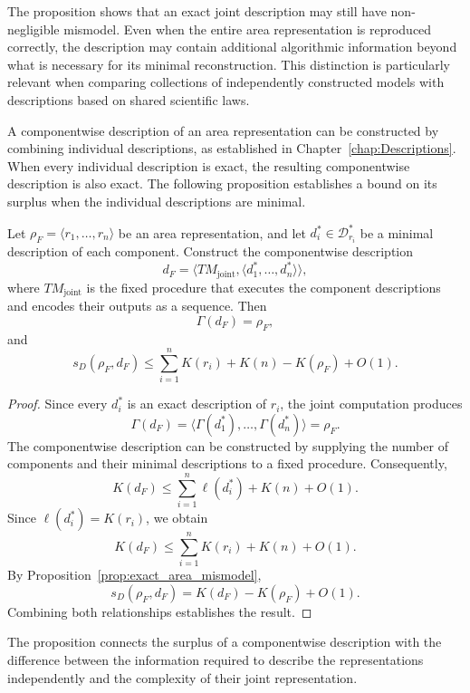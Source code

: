 The proposition shows that an exact joint description may still have non-negligible mismodel. Even when the entire area representation is reproduced correctly, the description may contain additional algorithmic information beyond what is necessary for its minimal reconstruction. This distinction is particularly relevant when comparing collections of independently constructed models with descriptions based on shared scientific laws.

A componentwise description of an area representation can be constructed by combining individual descriptions, as established in Chapter~\ref{chap:Descriptions}. When every individual description is exact, the resulting componentwise description is also exact. The following proposition establishes a bound on its surplus when the individual descriptions are minimal.

\begin{proposition}
\label{prop:componentwise_area_surplus}
Let $\rho_F=\langle r_1,\ldots,r_n\rangle$ be an area representation, and let $d_i^\ast\in\mathcal D_{r_i}^\ast$ be a minimal description of each component. Construct the componentwise description
\[
d_F = \langle TM_{\mathrm{joint}}, \langle d_1^\ast,\ldots,d_n^\ast\rangle\rangle,
\]
where $TM_{\mathrm{joint}}$ is the fixed procedure that executes the component descriptions and encodes their outputs as a sequence. Then
\[
\Gamma(d_F)=\rho_F,
\]
and
\[
s_D(\rho_F,d_F) \leq \sum_{i=1}^{n}K(r_i) + K(n) - K(\rho_F) + O(1).
\]
\end{proposition}
\begin{proof}
Since every $d_i^\ast$ is an exact description of $r_i$, the joint computation produces
\[
\Gamma(d_F) = \langle\Gamma(d_1^\ast),\ldots, \Gamma(d_n^\ast)\rangle = \rho_F.
\]
The componentwise description can be constructed by supplying the number of components and their minimal descriptions to a fixed procedure. Consequently,
\[
K(d_F) \leq \sum_{i=1}^{n}\ell(d_i^\ast) + K(n) + O(1).
\]
Since $\ell(d_i^\ast)=K(r_i)$, we obtain
\[
K(d_F) \leq \sum_{i=1}^{n}K(r_i)+K(n)+O(1).
\]
By Proposition~\ref{prop:exact_area_mismodel},
\[
s_D(\rho_F,d_F) = K(d_F)-K(\rho_F)+O(1).
\] 
Combining both relationships establishes the result.
\end{proof}

The proposition connects the surplus of a componentwise description with the difference between the information required to describe the representations independently and the complexity of their joint representation.

